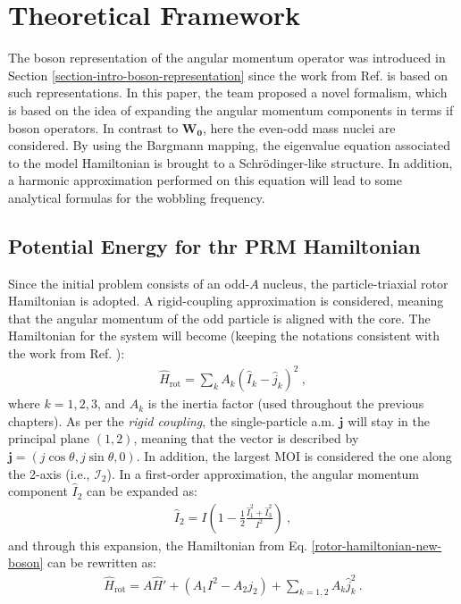 \section{Theoretical Framework}
\label{section-new-boson-theoretical-framework}

The boson representation of the angular momentum operator was introduced in Section \ref{section-intro-boson-representation} since the work from Ref. \cite{raduta2020new} is based on such representations. In this paper, the team proposed a novel formalism, which is based on the idea of expanding the angular momentum components in terms if boson operators. In contrast to $\mathbf{W_0}$, here the even-odd mass nuclei are considered. By using the Bargmann mapping, the eigenvalue equation associated to the model Hamiltonian is brought to a Schrödinger-like structure. In addition, a harmonic approximation performed on this equation will lead to some analytical formulas for the wobbling frequency.

\subsection{Potential Energy for thr PRM Hamiltonian}

Since the initial problem consists of an odd-$A$ nucleus, the particle-triaxial rotor Hamiltonian is adopted. A rigid-coupling approximation is considered, meaning that the angular momentum of the odd particle is aligned with the core. The Hamiltonian for the system will become (keeping the notations consistent with the work from Ref. \cite{raduta2020new}):
\begin{align}
    \hat{H}_\text{rot}=\sum_{k}A_k\left(\hat{I}_k-\hat{j}_k\right)^2\ ,
    \label{rotor-hamiltonian-new-boson}
\end{align}
where $k=1,2,3$, and $A_k$ is the inertia factor (used throughout the previous chapters). As per the \emph{rigid coupling}, the single-particle a.m. $\mathbf{j}$ will stay in the principal plane $(1,2)$, meaning that the vector is described by $\mathbf{j}=\left(j\cos\theta,j\sin\theta,0\right)$. In addition, the largest MOI is considered the one along the 2-axis (i.e., $\mathcal{I}_2$). In a first-order approximation, the angular momentum component $\hat{I}_2$ can be expanded as:
\begin{align}
    \hat{I}_2=I\left(1-\frac{1}{2}\frac{\hat{I}_1^2+\hat{I}_3^2}{I^2}\right)\ ,
\end{align}
and through this expansion, the Hamiltonian from Eq. \ref{rotor-hamiltonian-new-boson} can be rewritten as:
\begin{align}
    \hat{H}_\text{rot}=A\hat{H}'+\left(A_1I^2-A_2j_2\right)+\sum_{k=1,2}A_k\hat{j}_k^2\ .
    \label{rewritten-rotor-hamiltonian-new-boson}
\end{align}

